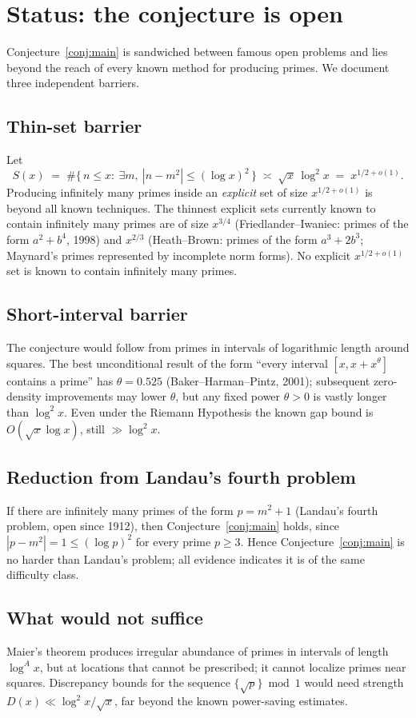 \documentclass[11pt]{article}
\theoremstyle{definition}
\theoremstyle{remark}
\begin{document}
\section{Status: the conjecture is open}

Conjecture~\ref{conj:main} is sandwiched between famous open problems and lies beyond the reach of every known method for producing primes. We document three independent barriers.

\subsection{Thin-set barrier}
Let
\[
S(x) \;=\; \#\{\, n \le x :\ \exists m,\ |n - m^2| \le (\log x)^2 \,\} \;\asymp\; \sqrt{x}\,\log^2 x \;=\; x^{1/2+o(1)} .
\]
Producing infinitely many primes inside an \emph{explicit} set of size $x^{1/2+o(1)}$ is beyond all known techniques. The thinnest explicit sets currently known to contain infinitely many primes are of size $x^{3/4}$ (Friedlander--Iwaniec: primes of the form $a^2+b^4$, 1998) and $x^{2/3}$ (Heath--Brown: primes of the form $a^3+2b^3$; Maynard's primes represented by incomplete norm forms). No explicit $x^{1/2+o(1)}$ set is known to contain infinitely many primes.

\subsection{Short-interval barrier}
The conjecture would follow from primes in intervals of logarithmic length around squares. The best unconditional result of the form ``every interval $[x, x + x^{\theta}]$ contains a prime'' has $\theta = 0.525$ (Baker--Harman--Pintz, 2001); subsequent zero-density improvements may lower $\theta$, but any fixed power $\theta > 0$ is vastly longer than $\log^2 x$. Even under the Riemann Hypothesis the known gap bound is $O(\sqrt{x}\log x)$, still $\gg \log^2 x$.

\subsection{Reduction from Landau's fourth problem}
If there are infinitely many primes of the form $p = m^2 + 1$ (Landau's fourth problem, open since 1912), then Conjecture~\ref{conj:main} holds, since $|p - m^2| = 1 \le (\log p)^2$ for every prime $p \ge 3$. Hence Conjecture~\ref{conj:main} is no harder than Landau's problem; all evidence indicates it is of the same difficulty class.

\subsection{What would not suffice}
Maier's theorem produces irregular abundance of primes in intervals of length $\log^A x$, but at locations that cannot be prescribed; it cannot localize primes near squares. Discrepancy bounds for the sequence $\{\sqrt{p}\} \bmod 1$ would need strength $D(x) \ll \log^2 x/\sqrt{x}$, far beyond the known power-saving estimates.
\end{document}

